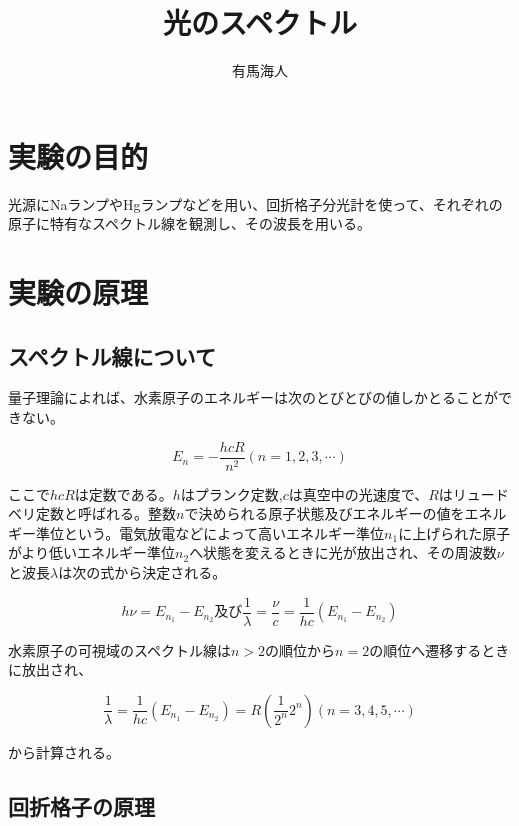 \documentclass{jsarticle}
\begin{document}
\title{光のスペクトル}
\author{有馬海人}
\maketitle

\section{実験の目的}

光源にNaランプやHgランプなどを用い、回折格子分光計を使って、それぞれの原子に特有なスペクトル線を観測し、その波長を用いる。

\section{実験の原理}

\subsection{スペクトル線について}

量子理論によれば、水素原子のエネルギーは次のとびとびの値しかとることができない。

\begin{equation}
    E_n = -\frac{hcR}{n^2} (n = 1,2,3,\cdots)
\end{equation}

ここで$hcR$は定数である。$h$はプランク定数,$c$は真空中の光速度で、$R$はリュードベリ定数と呼ばれる。整数$n$で決められる原子状態及びエネルギーの値をエネルギー準位という。電気放電などによって高いエネルギー準位$n_1$に上げられた原子がより低いエネルギー準位$n_2$へ状態を変えるときに光が放出され、その周波数$\nu$と波長$\lambda$は次の式から決定される。

\begin{equation}
    h\nu = E_{n_1} - E_{n_2} 及び　\frac{1}{\lambda} = \frac{\nu}{c} = \frac{1}{hc} (E_{n_1} - E_{n_2})
\end{equation}

水素原子の可視域のスペクトル線は$n > 2$の順位から$n = 2$の順位へ遷移するときに放出され、

\begin{equation}
    \frac{1}{\lambda} = \frac{1}{hc}(E_{n_1} - E_{n_2}) = R(\frac{1}{2^n}{2^n}) (n = 3,4,5,\cdots)
\end{equation}

から計算される。

\subsection{回折格子の原理}
\end{document}
